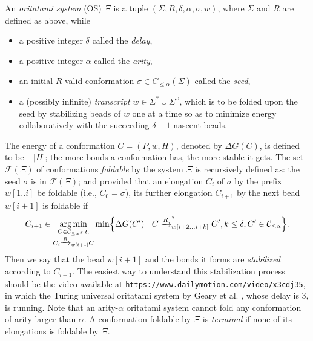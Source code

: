 \documentclass[runningheads]{llncs}
\DeclareMathOperator*{\argmin}{arg\,min}
\begin{document}
An \textit{oritatami system} (OS) $\Xi$ is a tuple $(\Sigma, R, \delta, \alpha, \sigma, w)$, where $\Sigma$ and $R$ are defined as above, while
\begin{itemize}
\item a positive integer $\delta$ called the \textit{delay}, 
\item a positive integer $\alpha$ called the \textit{arity}, %
\item an initial $R$-valid conformation $\sigma \in C_{\le \alpha}(\Sigma)$ called the \textit{seed},
\item a (possibly infinite) \textit{transcript} $w \in \Sigma^* \cup \Sigma^\omega$, which is to be folded upon the seed by stabilizing beads of $w$ one at a time so as to minimize energy collaboratively with the succeeding $\delta{-}1$ nascent beads. 
\end{itemize}
%
The energy of a conformation $C = (P, w, H)$, denoted by $\Delta G(C)$, is defined to be ${-}|H|$; the more bonds a conformation has, the more stable it gets. 
The set $\mathcal{F}(\Xi)$ of conformations \textit{foldable} by the system $\Xi$ is recursively defined as: the seed $\sigma$ is in $\mathcal{F}(\Xi)$; and provided that an elongation $C_i$ of $\sigma$ by the prefix $w[1..i]$ be foldable (i.e., $C_0 = \sigma$), its further elongation $C_{i+1}$ by the next bead $w[i+1]$ is foldable if 
\begin{equation}\label{eq:OS_CF}
C_{i+1} \in \argmin_{
\substack{
C \in \mathcal{C}_{\le \alpha} s.t. \\
C_i \xrightarrow{R}_{w[i+1]}C \\
}
}
\min \Bigl\{ \Delta G(C') \Bigm|
C \xrightarrow{R}^*_{w[i+2...i+k]}C', k\le \delta, C' \in \mathcal{C}_{\le \alpha}
\Bigr\}.
\end{equation}
%
Then we say that the bead $w[i+1]$ and the bonds it forms are \textit{stabilized} according to $C_{i+1}$. 
The easiest way to understand this stabilization process should be the video available at \href{https://www.dailymotion.com/video/x3cdj35}{\tt https://www.dailymotion.com/video/x3cdj35}, in which the Turing universal oritatami system by Geary et al. \cite{GeMeScSe2018}, whose delay is 3, is running. 
Note that an arity-$\alpha$ oritatami system cannot fold any conformation of arity larger than $\alpha$. %
A conformation foldable by $\Xi$ is \textit{terminal} if none of its elongations is foldable by $\Xi$. 
\end{document}
